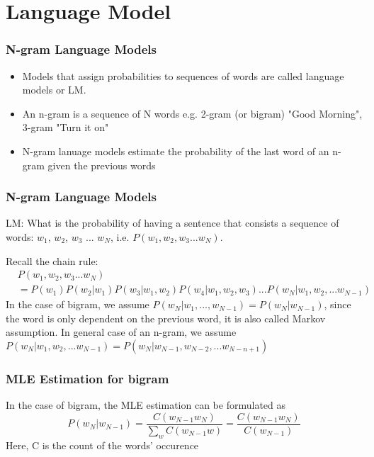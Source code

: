 \documentclass[notheorems, aspectratio=54]{beamer}
\begin{document}
\section{Language Model}


\begin{frame}
\frametitle{N-gram Language Models}
\begin{itemize}
\item Models that assign probabilities to sequences of words are called language models or LM.
\item An n-gram is a sequence of N words e.g. 2-gram (or bigram) "Good Morning", 3-gram "Turn it on"
\item N-gram lanuage models estimate the probability of the last word of an n-gram given the previous words
\end{itemize}
\end{frame}

\begin{frame}
\frametitle{N-gram Language Models}
LM: What is the probability of having a sentence that consists a sequence of words: $w_1$, $w_2$, $w_3$ ... $w_N$, i.e. $P(w_1, w_2, w_3...w_N)$. 

Recall the chain rule:
\begin{align*}
&P(w_1, w_2, w_3...w_N)\\
&=P(w_1)P(w_2|w_1)P(w_3|w_1, w_2)P(w_4|w_1, w_2, w_3)...P(w_N|w_1, w_2, ...w_{N-1})
\end{align*}
In the case of bigram, we assume $P(w_N|w_1,...,w_{N-1})=P(w_N|w_{N-1})$, since the word is only dependent on the previous word, it is also called Markov assumption.
\vspace{0.2cm}
In general case of an n-gram, we assume $P(w_N|w_1, w_2, ...w_{N-1})=P(w_N|w_{N-1}, w_{N-2}, ...w_{N-n+1})$
\end{frame}

\begin{frame}
\frametitle{MLE Estimation for bigram }
In the case of bigram, the MLE estimation can be formulated as 
$$
P(w_N|w_{N-1})=\frac{C(w_{N-1}w_N)}{\sum_{w}C(w_{N-1}w)}=\frac{C(w_{N-1}w_N)}{C(w_{N-1})}
$$
Here, C is the count of the words' occurence
\end{frame}
\end{document}
